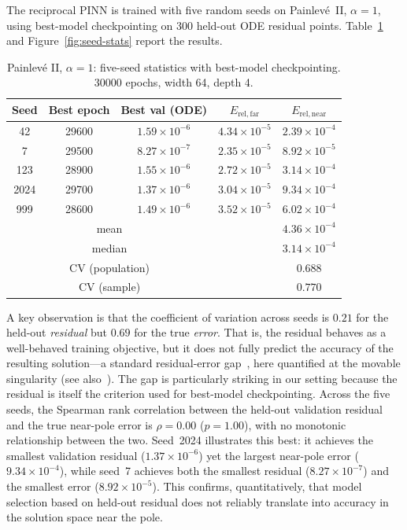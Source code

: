 \documentclass[11pt,a4paper]{article}
\theoremstyle{definition}
\begin{document}
The reciprocal PINN is trained with five random seeds on Painlev\'e~II,
$\alpha=1$, using best-model checkpointing on 300 held-out ODE residual points. Table~\ref{tab:seeds} and Figure~\ref{fig:seed-stats}
report the results.

\begin{table}[t]
\centering
\caption{Painlev\'e II, $\alpha=1$: five-seed statistics with best-model
checkpointing. 30000 epochs, width 64, depth 4.}
\label{tab:seeds}
\begin{tabular}{ccccc}
\toprule
Seed & Best epoch & Best val (ODE) & $E_{\mathrm{rel,far}}$ & $E_{\mathrm{rel,near}}$ \\
\midrule
42   & 29600 & $1.59\times 10^{-6}$ & $4.34\times 10^{-5}$ & $2.39\times 10^{-4}$ \\
7    & 29500 & $8.27\times 10^{-7}$ & $2.35\times 10^{-5}$ & $8.92\times 10^{-5}$ \\
123  & 28900 & $1.55\times 10^{-6}$ & $2.72\times 10^{-5}$ & $3.14\times 10^{-4}$ \\
2024 & 29700 & $1.37\times 10^{-6}$ & $3.04\times 10^{-5}$ & $9.34\times 10^{-4}$ \\
999  & 28600 & $1.49\times 10^{-6}$ & $3.52\times 10^{-5}$ & $6.02\times 10^{-4}$ \\
\midrule
\multicolumn{3}{c}{mean} & & $4.36\times 10^{-4}$ \\
\multicolumn{3}{c}{median} & & $3.14\times 10^{-4}$ \\
\multicolumn{3}{c}{CV (population)} & & $0.688$ \\
\multicolumn{3}{c}{CV (sample)} & & $0.770$ \\
\bottomrule
\end{tabular}
\end{table}

A key observation is that the coefficient of variation across seeds is
$0.21$ for the held-out \emph{residual} but $0.69$ for the true
\emph{error}. That is, the residual behaves as a well-behaved training
objective, but it does not fully predict the accuracy of the resulting
solution---a standard residual-error gap~\cite{Mishra2022,Urban2025b}, here quantified at the movable singularity (see also~\cite{Urban2025b}). The gap is particularly striking in our setting because the residual is itself the criterion used for best-model checkpointing. Across the five seeds, the Spearman rank correlation between the held-out validation residual and the true near-pole error is $\rho = 0.00$ ($p = 1.00$), with no monotonic relationship between the two. Seed~2024 illustrates this best: it achieves the smallest validation residual ($1.37\times 10^{-6}$) yet the largest near-pole error ($9.34\times 10^{-4}$), while seed~7 achieves both the smallest residual ($8.27\times 10^{-7}$) and the smallest error ($8.92\times 10^{-5}$). This confirms, quantitatively, that model selection based on held-out residual does not reliably translate into accuracy in the solution space near the pole.
\end{document}
